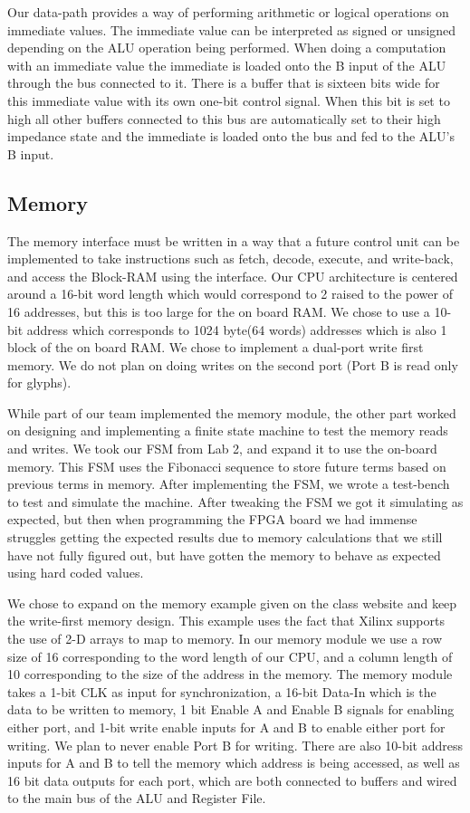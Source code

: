 \documentclass[onecolumn, 12pt]{IEEEtran}
\begin{document}
\par
Our data-path provides a way of performing arithmetic or logical operations on immediate values. The immediate value can be interpreted as signed or unsigned depending on the ALU operation being performed. When doing a computation with an immediate value the immediate is loaded onto the B input of the ALU through the bus connected to it. There is a buffer that is sixteen bits wide for this immediate value with its own one-bit control signal. When this bit is set to high all other buffers connected to this bus are automatically set to their high impedance state and the immediate is loaded onto the bus and fed to the ALU's B input.
\subsection{Memory}
The memory interface must be written in a way that a future control unit can be implemented to take instructions such as fetch, decode, execute, and write-back, and access the Block-RAM using the interface. Our CPU architecture is centered around a 16-bit word length which would correspond to 2 raised to the power of 16 addresses, but this is too large for the on board RAM. We chose to use a 10-bit address which corresponds to 1024 byte(64 words) addresses which is also 1 block of the on board RAM. We chose to implement a dual-port write first memory. We do not plan on doing writes on the second port (Port B is read only for glyphs).
\par
While part of our team implemented the memory module, the other part worked on designing and implementing a finite state machine to test the memory reads and writes. We took our FSM from Lab 2, and expand it to use the on-board memory. This FSM uses the Fibonacci sequence to store future terms based on previous terms in memory.  After implementing the FSM, we wrote a test-bench to test and simulate the machine. After tweaking the FSM we got it simulating as expected, but then when programming the FPGA board we had immense struggles getting the expected results due to memory calculations that we still have not fully figured out, but have gotten the memory to behave as expected using hard coded values.
\par
	We chose to expand on the memory example given on the class website and keep the write-first memory design. This example uses the fact that Xilinx supports the use of 2-D arrays to map to memory. In our memory module we use a row size of 16 corresponding to the word length of our CPU, and a column length of 10 corresponding to the size of the address in the memory. The memory module takes a 1-bit CLK as input for synchronization, a 16-bit Data-In which is the data to be written to memory, 1 bit Enable A and Enable B signals for enabling either port, and 1-bit write enable inputs for A and B to enable either port for writing. We plan to never enable Port B for writing. There are also 10-bit address inputs for A and B to tell the memory which address is being accessed, as well as 16 bit data outputs for each port, which are both connected to buffers and wired to the main bus of the ALU and Register File.
\end{document}
